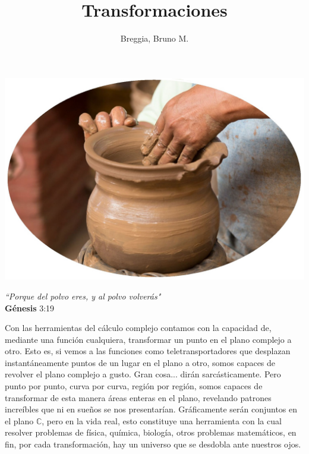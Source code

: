 \documentclass[12pt]{article}
\theoremstyle{definition}
\theoremstyle{theorem}
\theoremstyle{corolary}
\begin{document}
	\title{Transformaciones}
	\author{Breggia, Bruno M.}
	\date{}
	\maketitle

\begin{center}
	\includegraphics[scale=0.4]{vajilla2.jpg}
	
	\textit{``Porque del polvo eres, y al polvo volver\'as"}\\
	\textbf{G\'enesis} 3:19
\end{center}

Con las herramientas del c\'alculo complejo contamos con la capacidad de, mediante una funci\'on cualquiera, transformar un punto en el plano complejo a otro. Esto es, si vemos a las funciones como teletransportadores que desplazan instant\'aneamente puntos de un lugar en el plano a otro, somos capaces de revolver el plano complejo a gusto. Gran cosa... dir\'an sarc\'asticamente. Pero punto por punto, curva por curva, regi\'on por regi\'on, somos capaces de transformar de esta manera \'areas enteras en el plano, revelando patrones incre\'ibles que ni en sue\~nos se nos presentar\'ian. Gr\'aficamente ser\'an conjuntos en el plano $\mathbb{C}$, pero en la vida real, esto constituye una herramienta con la cual resolver problemas de f\'isica, qu\'imica, biolog\'ia, otros problemas matem\'aticos, en fin, por cada transformaci\'on, hay un universo que se desdobla ante nuestros ojos.
\pagebreak
\tableofcontents
\pagebreak
\end{document}
